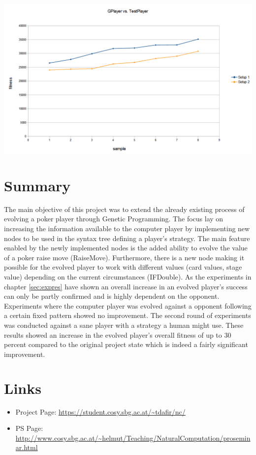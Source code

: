\documentclass[12pt,fleqn,a4paper]{article}
\begin{document}
\begin{center}
	\includegraphics[width=.7\textwidth]{gp_vs_tp_new.png}
\end{center}

\section{Summary}
The main objective of this project was to extend the already existing process of evolving a poker player through Genetic Programming. The focus lay on increasing the information available to the computer player by implementing new nodes to be used in the syntax tree defining a player's strategy. The main feature enabled by the newly implemented nodes is the added ability to evolve the value of a poker raise move (RaiseMove). Furthermore, there is a new node making it possible for the evolved player to work with different values (card values, stage value) depending on the current circumstances (IFDouble).
As the experiments in chapter \ref{sec:expres} have shown an overall increase in an evolved player's success can only be partly confirmed and is highly dependent on the opponent. Experiments where the computer player was evolved against a opponent following a certain fixed pattern showed no improvement. The second round of experiments was conducted against a sane player with a strategy a human might use. These results showed an increase in the evolved player's overall fitness of up to 30 percent compared to the original project state which is indeed a fairly significant improvement.


\section{Links}

\begin{itemize}
\item Project Page: \url{https://student.cosy.sbg.ac.at/~tdafir/nc/}
\item PS Page:
\url{http://www.cosy.sbg.ac.at/~helmut/Teaching/NaturalComputation/proseminar.html}

\end{itemize}

\nocite{*}

\end{document}
